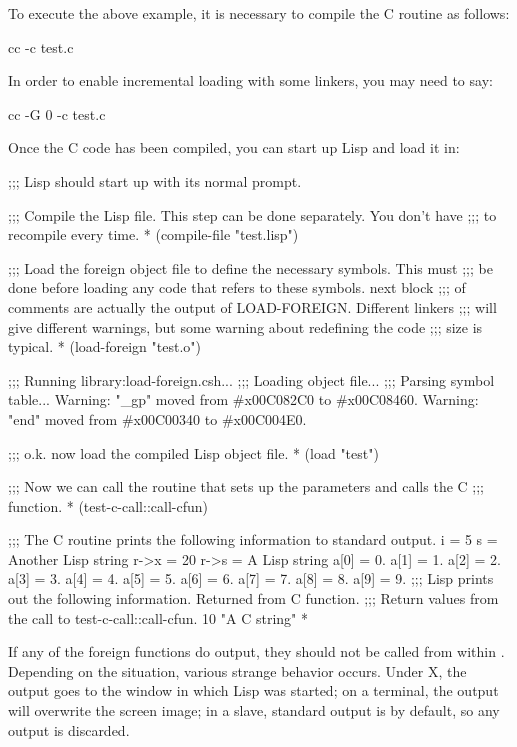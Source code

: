 To execute the above example, it is necessary to compile the C routine as
follows:

\begin{example}
cc -c test.c
\end{example}

In order to enable incremental loading with some linkers, you may need to say:

\begin{example}
cc -G 0 -c test.c
\end{example}

Once the C code has been compiled, you can start up Lisp and load it in:

\begin{example}
;;; Lisp should start up with its normal prompt.

;;; Compile the Lisp file.  This step can be done separately.  You don't have
;;; to recompile every time.
* (compile-file "test.lisp")

;;; Load the foreign object file to define the necessary symbols.  This must
;;; be done before loading any code that refers to these symbols.  next block
;;; of comments are actually the output of LOAD-FOREIGN.  Different linkers
;;; will give different warnings, but some warning about redefining the code
;;; size is typical.
* (load-foreign "test.o")

;;; Running library:load-foreign.csh...
;;; Loading object file...
;;; Parsing symbol table...
Warning:  "_gp" moved from #x00C082C0 to #x00C08460.
Warning:  "end" moved from #x00C00340 to #x00C004E0.

;;; o.k. now load the compiled Lisp object file.
* (load "test")

;;; Now we can call the routine that sets up the parameters and calls the C
;;; function.
* (test-c-call::call-cfun)

;;; The C routine prints the following information to standard output.
i = 5
s = Another Lisp string
r->x = 20
r->s = A Lisp string
a[0] = 0.
a[1] = 1.
a[2] = 2.
a[3] = 3.
a[4] = 4.
a[5] = 5.
a[6] = 6.
a[7] = 7.
a[8] = 8.
a[9] = 9.
;;; Lisp prints out the following information.
Returned from C function.
;;; Return values from the call to test-c-call::call-cfun.
10
"A C string"
*
\end{example}

If any of the foreign functions do output, they should not be called
from within \hemlock{}. Depending on the situation, various strange
behavior occurs. Under X, the output goes to the window in which Lisp
was started; on a terminal, the output will overwrite the \hemlock{}
screen image; in a \hemlock{} slave, standard output is
 by default, so any output is discarded.
